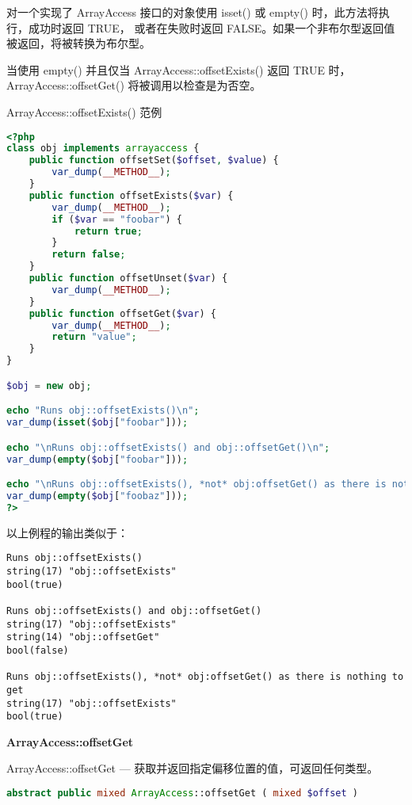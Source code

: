对一个实现了 ArrayAccess 接口的对象使用 isset() 或 empty() 时，此方法将执行，成功时返回 TRUE， 或者在失败时返回 FALSE。如果一个非布尔型返回值被返回，将被转换为布尔型。

当使用 empty() 并且仅当 ArrayAccess::offsetExists() 返回 TRUE 时， ArrayAccess::offsetGet() 将被调用以检查是为否空。


\begin{example}
ArrayAccess::offsetExists() 范例
\begin{lstlisting}[language=PHP]
<?php
class obj implements arrayaccess {
    public function offsetSet($offset, $value) {
        var_dump(__METHOD__);
    }
    public function offsetExists($var) {
        var_dump(__METHOD__);
        if ($var == "foobar") {
            return true;
        }
        return false;
    }
    public function offsetUnset($var) {
        var_dump(__METHOD__);
    }
    public function offsetGet($var) {
        var_dump(__METHOD__);
        return "value";
    }
}

$obj = new obj;

echo "Runs obj::offsetExists()\n";
var_dump(isset($obj["foobar"]));

echo "\nRuns obj::offsetExists() and obj::offsetGet()\n";
var_dump(empty($obj["foobar"]));

echo "\nRuns obj::offsetExists(), *not* obj:offsetGet() as there is nothing to get\n";
var_dump(empty($obj["foobaz"]));
?>
\end{lstlisting}
\end{example}

以上例程的输出类似于：

\begin{verbatim}
Runs obj::offsetExists()
string(17) "obj::offsetExists"
bool(true)

Runs obj::offsetExists() and obj::offsetGet()
string(17) "obj::offsetExists"
string(14) "obj::offsetGet"
bool(false)

Runs obj::offsetExists(), *not* obj:offsetGet() as there is nothing to get
string(17) "obj::offsetExists"
bool(true)
\end{verbatim}

\textbf{ArrayAccess::offsetGet}

ArrayAccess::offsetGet — 获取并返回指定偏移位置的值，可返回任何类型。

\begin{lstlisting}[language=PHP]
abstract public mixed ArrayAccess::offsetGet ( mixed $offset )
\end{lstlisting}


